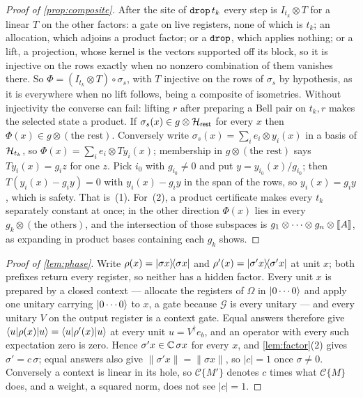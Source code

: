 \documentclass[acmsmall,screen,review,anonymous,nonacm]{acmart}
\begin{document}
\begin{proof}[Proof of \cref{prop:composite}]
After the site of $\texttt{drop}\,t_k$ every step is $I_{t_k} \otimes T$ for a linear
$T$ on the other factors: a gate on live registers, none of which is $t_k$;
an allocation, which adjoins a product factor; or a $\texttt{drop}$, which applies
nothing; or a lift, a projection, whose kernel is the vectors supported off its
block, so it is injective on the rows exactly when no nonzero combination of them
vanishes there. So $\Phi = (I_{t_k} \otimes T) \circ \sigma_s$, with $T$ injective on the
rows of $\sigma_s$ by hypothesis, as it is everywhere when no lift follows, being a composite of
isometries. Without injectivity the converse can fail: lifting $r$ after
preparing a Bell pair on $t_k,r$ makes the selected state a product.
If $\sigma_s(x) \in g \otimes \mathcal{H}_{\mathsf{rest}}$ for every $x$ then $\Phi(x) \in g \otimes
(\text{the rest})$. Conversely write $\sigma_s(x) = \sum_i e_i \otimes
y_i(x)$ in a basis of $\mathcal{H}_{t_k}$, so $\Phi(x) = \sum_i e_i \otimes
Ty_i(x)$; membership in $g \otimes (\text{the rest})$ says $Ty_i(x) = g_i z$ for one $z$.
Pick $i_0$ with $g_{i_0} \ne 0$ and put $y = y_{i_0}(x)/g_{i_0}$; then
$T(y_i(x) - g_iy) = 0$ with $y_i(x) - g_iy$ in the span of the rows, so $y_i(x) = g_iy$, which is safety. That is~(1). For~(2), a
product certificate makes every $t_k$ separately constant at once; in the
other direction $\Phi(x)$ lies in every $g_k \otimes (\text{the others})$,
and the intersection of those subspaces is $g_1 \otimes \cdots \otimes g_n
\otimes [\![A]\!]$, as expanding in product bases containing each $g_k$ shows.
\end{proof}

\begin{proof}[Proof of \cref{lem:phase}]
Write $\rho(x) = \lvert \sigma x \rangle\!\langle \sigma x \rvert$ and $\rho'(x) = \lvert \sigma' x \rangle\!\langle \sigma' x \rvert$ at unit
$x$; both prefixes return every register, so neither has a hidden factor.
Every unit $x$ is prepared by a closed context --- allocate the registers of
$\Omega$ in $\lvert 0\cdots0 \rangle$ and apply one unitary carrying $\lvert 0\cdots0 \rangle$
to $x$, a gate because $\mathcal G$ is every unitary --- and every unitary
$V$ on the output register is a context gate. Equal answers therefore give
$\langle u \rvert\rho(x)\lvert u \rangle = \langle u \rvert\rho'(x)\lvert u \rangle$ at every unit $u =
V^{\dagger}e_b$, and an operator with every such expectation zero is zero.
Hence $\sigma' x \in \mathbb{C}\,\sigma x$ for every $x$, and \cref{lem:factor}(2)
gives $\sigma' = c\,\sigma$; equal answers also give $\lVert\sigma' x\rVert =
\lVert\sigma x\rVert$, so $|c| = 1$ once $\sigma \neq 0$. Conversely a context
is linear in its hole, so $\mathcal C\{M'\}$ denotes $c$ times what $\mathcal C\{M\}$
does, and a weight, a squared norm, does not see $|c| = 1$.
\end{proof}
\end{document}
